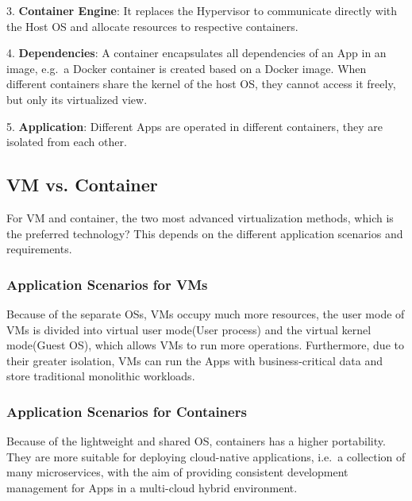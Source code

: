 3.
\textbf{Container Engine}:
It replaces the Hypervisor to communicate directly with the Host OS and allocate
resources to respective containers.

4.
\textbf{Dependencies}:
A container encapsulates all dependencies of an App in an image, e.g.\ a Docker container
is created based on a Docker image.
When different containers share the kernel of the host OS, they cannot access it freely,
but only its virtualized view\cite{b21}.

5.
\textbf{Application}:
Different Apps are operated in different containers, they are isolated from each other.

\subsection{VM vs. Container}
For VM and container, the two most advanced virtualization methods, which is
the preferred technology?
This depends on the different application scenarios and requirements.

\subsubsection{Application Scenarios for VMs}
Because of the separate OSs, VMs occupy much more resources, the user mode of VMs is
divided into virtual user mode(User process) and the virtual kernel mode(Guest OS),
which allows VMs to run more operations.
Furthermore, due to their greater isolation, VMs can run the Apps with
business-critical data\cite{b15} and store traditional monolithic workloads\cite{b20}.

\subsubsection{Application Scenarios for Containers}
Because of the lightweight and shared OS, containers has a higher portability\cite{b20}.
They are more suitable for deploying cloud-native applications, i.e.\ a collection of
many microservices, with the aim of providing consistent development management for
Apps in a multi-cloud hybrid environment\cite{b15}.